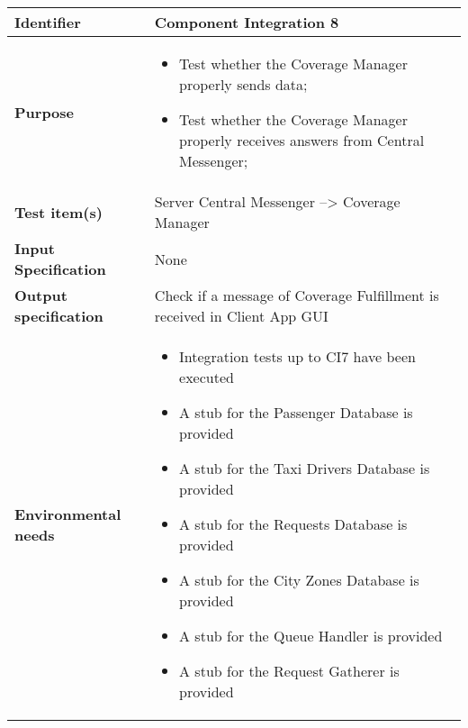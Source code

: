 \begin{center}
\begin{tabular}{lp{}}
\toprule
\textbf{Identifier}		&	Component Integration 8\\
\midrule
\textbf{Purpose}		&	\begin{itemize}
					\item Test whether the Coverage Manager properly sends data;
					\item Test whether the Coverage Manager properly receives answers from Central Messenger;
					\end{itemize}	\\
\textbf{Test item(s)}	&	Server Central Messenger --> Coverage Manager\\
\textbf{Input Specification}	&	None\\
\textbf{Output specification}	&	Check if a message of Coverage Fulfillment is received in Client App GUI\\
\textbf{Environmental needs}	&	\begin{itemize}
							\item Integration tests up to CI7 have been executed
							\item A stub for the Passenger Database is provided
							\item A stub for the Taxi Drivers Database is provided
							\item A stub for the Requests Database is provided
							\item A stub for the City Zones Database is provided
							\item A stub for the Queue Handler is provided
							\item A stub for the Request Gatherer is provided
							\end{itemize}	\\
\bottomrule
\end{tabular}
\end{center}




